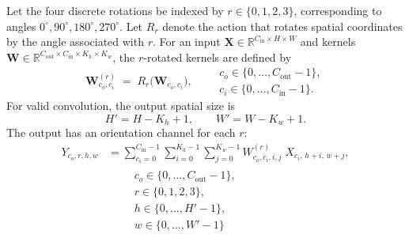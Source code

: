 Let the four discrete rotations be indexed by \(r \in \{0,1,2,3\}\),
corresponding to angles \(0^\circ, 90^\circ, 180^\circ, 270^\circ\).
Let \(R_r\) denote the action that rotates spatial coordinates by the angle
associated with \(r\).
For an input
\(\mathbf{X} \in \mathbb{R}^{C_{\mathrm{in}} \times H \times W}\)
and kernels
\(\mathbf{W} \in \mathbb{R}^{C_{\mathrm{out}} \times C_{\mathrm{in}} \times K_h \times K_w}\),
the \(r\)-rotated kernels are defined by
\begin{equation}
\label{eq:p4-rot-kernel-op}
\mathbf{W}^{(r)}_{c_o,c_i}
\;=\;
R_r\!\big(\mathbf{W}_{c_o,c_i}\big),
\qquad
\substack{
\displaystyle c_o \in \{0,\dots,C_{\mathrm{out}}-1\},\\[2pt]
\displaystyle c_i \in \{0,\dots,C_{\mathrm{in}}-1\}.
}
\end{equation}
For valid convolution, the output spatial size is
\begin{equation}
\label{eq:p4-valid-sizes}
H' = H - K_h + 1,
\qquad
W' = W - K_w + 1.
\end{equation}
The output has an orientation channel for each \(r\):
\begin{equation}
\label{eq:p4-conv}
\begin{split}
Y_{c_o, r, h, w}
&=
\sum_{c_i=0}^{C_{\mathrm{in}}-1}
\sum_{i=0}^{K_h-1}
\sum_{j=0}^{K_w-1}
W^{(r)}_{c_o,c_i,i,j}\;
X_{c_i,\,h+i,\,w+j},
\\[6pt]
&\qquad
\substack{
\displaystyle c_o \in \{0,\dots,C_{\mathrm{out}}-1\},\\
\displaystyle r \in \{0,1,2,3\},\\
\displaystyle h \in \{0,\dots,H'-1\},\\
\displaystyle w \in \{0,\dots,W'-1\}
}
\end{split}
\end{equation}





